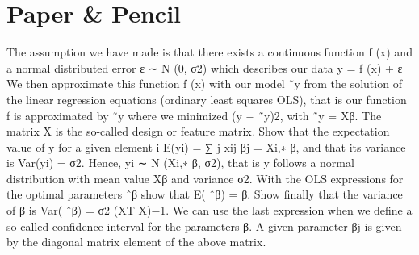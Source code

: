 \documentclass[twoside,11pt]{report}
\begin{document}
\section{Paper \& Pencil}
The assumption we have made is that there exists a continuous function f (x)
and a normal distributed error ε ∼ N (0, σ2) which describes our data
y = f (x) + ε
We then approximate this function f (x) with our model ˜y from the solution
of the linear regression equations (ordinary least squares OLS), that is our
function f is approximated by ˜y where we minimized (y − ˜y)2, with
˜y = Xβ.
The matrix X is the so-called design or feature matrix.
Show that the expectation value of y for a given element i
E(yi) = ∑
j
xij βj = Xi,∗ β,
and that its variance is
Var(yi) = σ2.
Hence, yi ∼ N (Xi,∗ β, σ2), that is y follows a normal distribution with mean
value Xβ and variance σ2.
With the OLS expressions for the optimal parameters ˆβ show that
E( ˆβ) = β.
Show finally that the variance of β is
Var( ˆβ) = σ2 (XT X)−1.
We can use the last expression when we define a so-called confidence interval
for the parameters β. A given parameter βj is given by the diagonal matrix
element of the above matrix.
\end{document}
